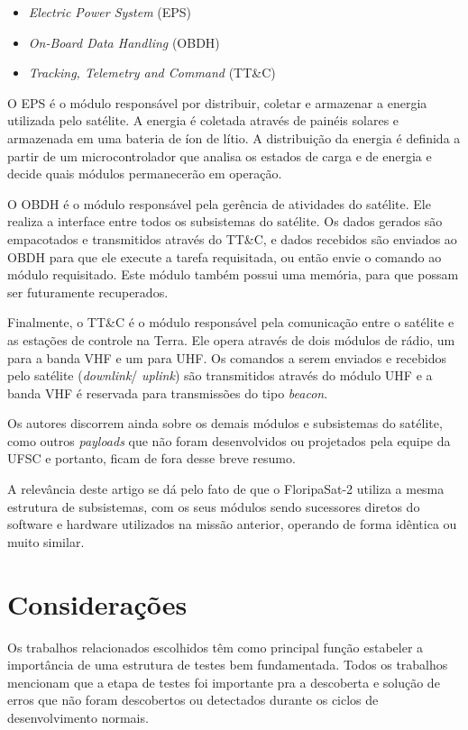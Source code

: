 \begin{itemize}
    \item \textit{Electric Power System} (EPS)
    \item \textit{On-Board Data Handling} (OBDH)
    \item \textit{Tracking, Telemetry and Command} (TT\&C)
\end{itemize}

O EPS é o módulo responsável por distribuir, coletar e armazenar a energia utilizada pelo satélite. A energia é coletada através de painéis solares e armazenada em uma bateria de íon de lítio. A distribuição da energia é definida a partir de um microcontrolador que analisa os estados de carga e de energia e decide quais módulos permanecerão em operação.

O OBDH é o módulo responsável pela gerência de atividades do satélite. Ele realiza a interface entre todos os subsistemas do satélite. Os dados gerados são empacotados e transmitidos através do TT\&C, e dados recebidos são enviados ao OBDH para que ele execute a tarefa requisitada, ou então envie o comando ao módulo requisitado. Este módulo também possui uma memória, para que possam ser futuramente recuperados.

Finalmente, o TT\&C é o módulo responsável pela comunicação entre o satélite e as estações de controle na Terra. Ele opera através de dois módulos de rádio, um para a banda VHF e um para UHF. Os comandos a serem enviados e recebidos pelo satélite (\textit{downlink}/ \textit{uplink}) são transmitidos através do módulo UHF e a banda VHF é reservada para transmissões do tipo \textit{beacon}.

Os autores discorrem ainda sobre os demais módulos e subsistemas do satélite, como outros \textit{payloads} que não foram desenvolvidos ou projetados pela equipe da UFSC e portanto, ficam de fora desse breve resumo.

A relevância deste artigo se dá pelo fato de que o FloripaSat-2 utiliza a mesma estrutura de subsistemas, com os seus módulos sendo sucessores diretos do software e hardware utilizados na missão anterior, operando de forma idêntica ou muito similar.


%

\section{Considerações}

Os trabalhos relacionados escolhidos têm como principal função estabeler a importância de uma estrutura de testes bem fundamentada. Todos os trabalhos mencionam que a etapa de testes foi importante pra a descoberta e solução de erros que não foram descobertos ou detectados durante os ciclos de desenvolvimento normais.

